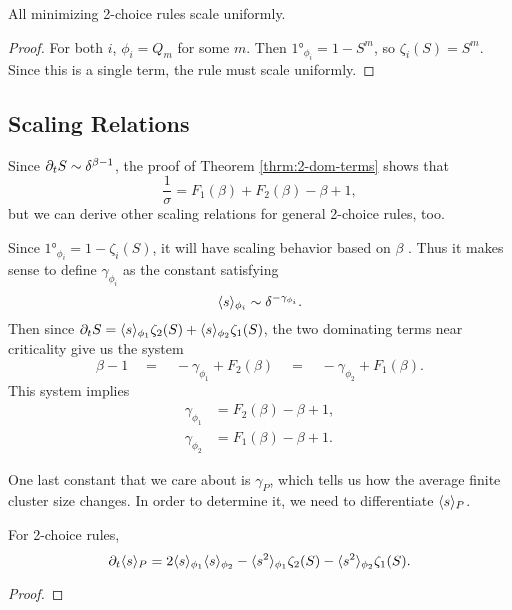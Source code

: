 \documentclass[twoside,10pt]{article}
\begin{document}
\begin{cor}
All minimizing 2-choice rules scale uniformly.
\end{cor}
\begin{proof}
	For both $i$, $\phi_i = Q_m$ for some $m$. Then $\ang{1}_{\phi_i} = 1 - S^{m}$, so $\zeta_i(S) = S^{m}$. Since this is a single term, the rule must scale uniformly.
\end{proof}

\subsection{Scaling Relations}

Since $\partial_{t}{S} \sim \delta^{\beta-1}$, the proof of Theorem \ref{thrm:2-dom-terms} shows that
\begin{equation}
	\frac{1}{\sigma} = F_1(\beta) + F_2(\beta) - \beta + 1,
\end{equation}
but we can derive other scaling relations for general 2-choice rules, too.

Since $\ang{1}_{\phi_i} = 1 - \zeta_i(S)$, it will have scaling behavior based on $\beta$ . Thus it makes sense to define $\gamma_{\phi_i}$ as the constant satisfying
\[
\langle s \rangle_{\phi_i} \sim \delta^{-\gamma_{\phi_i}}.
\] 
Then since $\partial_{t}{S} = \langle s \rangle_{\phi_1}\zeta_2(S) + \langle s \rangle_{\phi_2}\zeta_1(S)$, the two dominating terms near criticality give us the system
\[
	\beta -1 \quad=\quad -\gamma_{\phi_1} + F_2(\beta) \quad=\quad -\gamma_{\phi_2} + F_1(\beta).
\] 
This system implies
\begin{align}
	\gamma_{\phi_1} &= F_2(\beta) - \beta + 1,\\
	\gamma_{\phi_2} &= F_1(\beta) - \beta + 1.
\end{align}

One last constant that we care about is $\gamma_{P}$, which tells us how the average finite cluster size changes. In order to determine it, we need to differentiate $\langle s \rangle_{P}$.

\begin{prop}
For 2-choice rules,
\[
	\partial_{t}{\langle s \rangle_{P}} = 2\langle s \rangle_{\phi_1}\langle s \rangle_{\phi_2} - \langle s^2 \rangle_{\phi_1}\zeta_2(S) - \langle s^2 \rangle_{\phi_2}\zeta_1(S).
\] 
\end{prop}
\begin{proof}
\end{proof}
\end{document}
